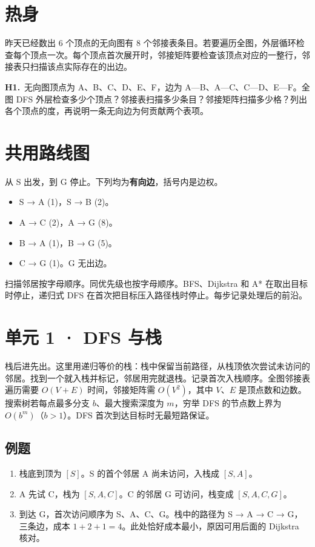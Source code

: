 \documentclass[UTF8,a4paper,11pt]{ctexart}
\newcommand{\PracticeQuestion}[3]{\par\Needspace{4\baselineskip}\noindent\begin{minipage}{\linewidth}\textbf{#1.}\ #2\par\noindent\rule{0pt}{#3mm}\par\end{minipage}\par}
\begin{document}
\section{热身}
昨天已经数出 6 个顶点的无向图有 8 个邻接表条目。若要遍历全图，外层循环检查每个顶点一次。每个顶点首次展开时，邻接矩阵要检查该顶点对应的一整行，邻接表只扫描该点实际存在的出边。

\PracticeQuestion{H1}{无向图顶点为 A、B、C、D、E、F，边为 A—B、A—C、C—D、E—F。全图 DFS 外层检查多少个顶点？邻接表扫描多少条目？邻接矩阵扫描多少格？列出各个顶点的度，再说明一条无向边为何贡献两个表项。}{40}

\section{共用路线图}
从 S 出发，到 G 停止。下列均为\textbf{有向边}，括号内是边权。

\begin{itemize}
\item S → A (1)，S → B (2)。
\item A → C (2)，A → G (8)。
\item B → A (1)，B → G (5)。
\item C → G (1)。G 无出边。
\end{itemize}
扫描邻居按字母顺序。同优先级也按字母顺序。BFS、Dijkstra 和 A* 在取出目标时停止，递归式 DFS 在首次把目标压入路径栈时停止。每步记录处理后的前沿。

\clearpage
\section{单元 1 · DFS 与栈}
栈后进先出。这里用递归等价的栈：栈中保留当前路径，从栈顶依次尝试未访问的邻居。找到一个就入栈并标记，邻居用完就退栈。记录首次入栈顺序。全图邻接表遍历需要 $O(V+E)$ 时间，邻接矩阵需 $O(V^2)$，其中 $V$、$E$ 是顶点数和边数。搜索树若每点最多分支 $b$、最大搜索深度为 $m$，穷举 DFS 的节点数上界为 $O(b^m)$（$b>1$）。DFS 首次到达目标时无最短路保证。

\subsection{例题}
\begin{enumerate}
\item 栈底到顶为 $[S]$。S 的首个邻居 A 尚未访问，入栈成 $[S,A]$。
\item A 先试 C，栈为 $[S,A,C]$。C 的邻居 G 可访问，栈变成 $[S,A,C,G]$。
\item 到达 G，首次访问顺序为 S、A、C、G。栈中的路径为 S → A → C → G，三条边，成本 $1+2+1=4$。此处恰好成本最小，原因可用后面的 Dijkstra 核对。
\end{enumerate}
\end{document}
